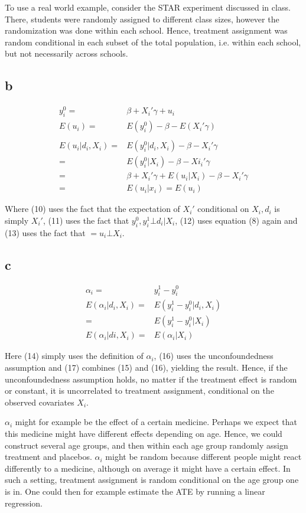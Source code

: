\documentclass[a4paper]{article}
\begin{document}
To use a real world example, consider the STAR experiment discussed in class. There, students were randomly assigned to different class sizes, however the randomization was done within each school. Hence, treatment assignment was random conditional in each subset of the total population, i.e. within each school, but not necessarily across schools. 
\subsection*{b}
\begin{align}
y_i^0=&\beta+X_i'\gamma+u_i\\
E(u_i)=&E(y_i^0)-\beta-E(X_i'\gamma)\\
\nonumber \\
E(u_i|d_i,X_i)=&E(y_i^0|d_i,X_i)-\beta-X_i'\gamma\\
=&E(y_i^0|X_i)-\beta-Xi_i'\gamma\\
=&\beta+X_i'\gamma+E(u_i|X_i)-\beta-X_i'\gamma\\
=&E(u_i|x_i)=E(u_i)
\end{align}

Where (10) uses the fact that the expectation of $X_i'$ conditional on $X_i,d_i$ is simply $X_i'$, (11) uses the fact that $y_i^0,y_i^1\bot d_i |X_i$, (12) uses equation (8) again and (13) uses the fact that $=u_i\bot X_i$. 
\subsection*{c}
\begin{align}
\alpha_i=&y_i^1-y_i^0\\
E(\alpha_i|d_i,X_i)=&E(y_i^1-y_i^0|d_i,X_i)\\
=&E(y_i^1-y_i^0|X_i)\\
E(\alpha_i|di,X_i)=&E(\alpha_i|X_i)
\end{align}

Here (14) simply uses the definition of $\alpha_i$, (16) uses the unconfoundedness assumption and (17) combines (15) and (16), yielding the result. Hence, if the unconfoundedness assumption holds, no matter if the treatment effect is random or constant, it is uncorrelated to treatment assignment, conditional on the observed covariates $X_i$. 

$\alpha_i$ might for example be the effect of a certain medicine. Perhaps we expect that this medicine might have different effects depending on age. Hence, we could construct several age groups, and then within each age group randomly assign treatment and placebos. $\alpha_i$ might be random because different people might react differently to a medicine, although on average it might have a certain effect. In such a setting, treatment assignment is random conditional on the age group one is in. One could then for example estimate the ATE by running a linear regression. 

		
\end{document}
